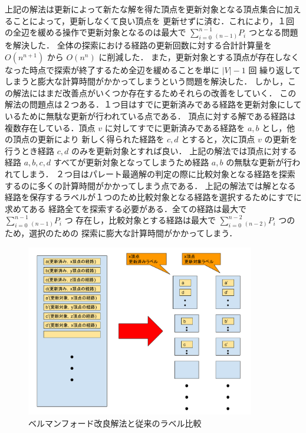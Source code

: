 \documentclass[12pt]{optlab-bachelor}
\begin{document}
上記の解法は更新によって新たな解を得た頂点を更新対象となる頂点集合に加えることによって，更新しなくて良い頂点を
更新せずに済む．これにより，１回の全辺を緩める操作で更新対象となるのは最大で
$\displaystyle \sum_{i=0}^{n-1} {}_{(n-1)}P_i$ つとなる問題を解決した．
全体の探索における経路の更新回数に対する合計計算量を $O(n^{n+1})$ から $O(n^n)$ に削減した．
また，更新対象とする頂点が存在しなくなった時点で探索が終了するため全辺を緩めることを単に $|V|-1$ 回
繰り返してしまうと膨大な計算時間がかかってしまうという問題を解決した．
しかし，この解法にはまだ改善点がいくつか存在するためそれらの改善をしていく．
この解法の問題点は２つある．１つ目はすでに更新済みである経路を更新対象にしているために無駄な更新が行われている点である．
頂点に対する解である経路は複数存在している．頂点 $v$ に対してすでに更新済みである経路を $a,b$ とし，他の頂点の更新により
新しく得られた経路を $c,d$ とすると，次に頂点 $v$ の更新を行うとき経路 $c,d$ のみを更新対象とすれば良い．
上記の解法では頂点に対する経路 $a,b,c,d$ すべてが更新対象となってしまうため経路 $a,b$ の無駄な更新が行われてしまう．
２つ目はパレート最適解の判定の際に比較対象となる経路を探索するのに多くの計算時間がかかってしまう点である．
上記の解法では解となる経路を保存するラベルが１つのため比較対象となる経路を選択するためにすでに求めてある
経路全てを探索する必要がある．全ての経路は最大で $\displaystyle \sum_{i=0}^{n-1} {}_{(n-1)}P_i$ つ
存在し，比較対象とする経路は最大で $\displaystyle \sum_{i=0}^{n-2} {}_{(n-2)}P_i$ つのため，選択のための
探索に膨大な計算時間がかかってしまう．

\begin{figure}[htbp]
  \centering
  \caption{ベルマンフォード改良解法と従来のラベル比較}
  \includegraphics[width=10.0cm]{fig/fig3.pdf}
\end{figure}
\end{document}
